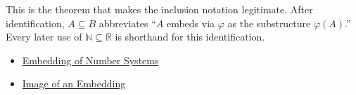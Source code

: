 \begin{remark*}[Interpretation]
This is the theorem that makes the inclusion notation legitimate. After
identification, $A\subseteq B$ abbreviates ``$A$ embeds via $\varphi$ as the
substructure $\varphi(A)$.'' Every later use of
$\mathbb{N}\subseteq\mathbb{R}$ is shorthand for this identification.
\end{remark*}
\begin{dependencies}
\begin{itemize}
  \item \hyperref[def:number-system-embedding]{Embedding of Number Systems}
  \item \hyperref[def:image-of-embedding]{Image of an Embedding}
\end{itemize}
\end{dependencies}

